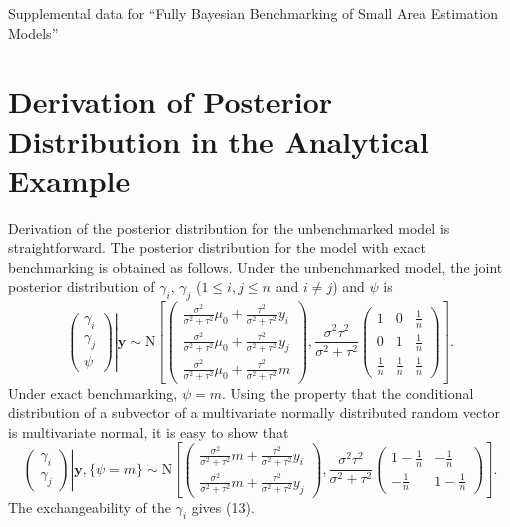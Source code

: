\documentclass[12pt]{article}
\begin{document}
\begin{center}
{\LARGE Supplemental data for ``Fully Bayesian Benchmarking of Small Area Estimation Models''}
\end{center}

\section{Derivation of Posterior Distribution in the Analytical Example}

Derivation of the posterior distribution for the unbenchmarked model is straightforward.  The posterior distribution for the model with exact benchmarking is obtained as follows.  Under the unbenchmarked model, the joint posterior distribution of $\gamma_i$, $\gamma_j$ ($1\leq i,j\leq n$ and $i\neq j$) and $\psi$ is
\begin{equation*}
\left.\left(\begin{array}{c}\gamma_i
\\\gamma_j\\\psi\end{array}\right)\right|\bm{y} \sim
 \text{N}\left[\left(\begin{array}{c}\frac{\sigma^2}{\sigma^2+\tau^2}\mu_0+\frac{\tau^2}{\sigma^2+\tau^2}y_i\\
 \frac{\sigma^2}{\sigma^2+\tau^2}\mu_0+\frac{\tau^2}{\sigma^2+\tau^2}y_j\\
\frac{\sigma^2}{\sigma^2+\tau^2}\mu_0+\frac{\tau^2}{\sigma^2+\tau^2}m\end{array}\right),
\frac{\sigma^2\tau^2}{\sigma^2+\tau^2}\left(\begin{array}{ccc}1 &0 &\frac{1}{n}\\0
& 1 &\frac{1}{n}\\\frac{1}{n}& \frac{1}{n}
&\frac{1}{n}\end{array}\right)\right].
\end{equation*}
Under exact benchmarking, $\psi=m$. Using the property that the conditional distribution of a subvector of a multivariate normally distributed random vector is multivariate normal, it is easy to show that
\begin{equation*}
\left.\left(\begin{array}{c}\gamma_i
\\\gamma_j\end{array}\right)\right|\bm{y}, \{\psi=m \}\sim
\text{N}\left[\left(\begin{array}{c}\frac{\sigma^2}{\sigma^2+\tau^2}m+\frac{\tau^2}{\sigma^2+\tau^2}y_i\\
\frac{\sigma^2}{\sigma^2+\tau^2}m+\frac{\tau^2}{\sigma^2+\tau^2}y_j\end{array}\right),
\frac{\sigma^2\tau^2}{\sigma^2+\tau^2}\left(\begin{array}{cc}1-\frac{1}{n} &
-\frac{1}{n}\\-\frac{1}{n} & 1-\frac{1}{n}\end{array}\right)\right].
\end{equation*}
The exchangeability of the $\gamma_i$ gives (13).
\end{document}
